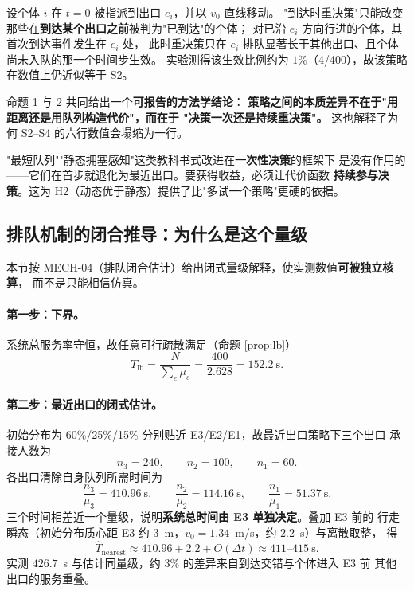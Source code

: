 \begin{csfprop}[命题 2（到达时重决策的生效范围）]
\label{prop:arrival}
设个体 $i$ 在 $t=0$ 被指派到出口 $e_i$，并以 $v_0$ 直线移动。
"到达时重决策"只能改变那些在\textbf{到达某个出口之前}被判为"已到达"的个体；
对已沿 $e_i$ 方向行进的个体，其首次到达事件发生在 $e_i$ 处，
此时重决策只在 $e_i$ 排队显著长于其他出口、且个体尚未入队的那一个时间步生效。
实验测得该生效比例约为 $1\%$（4/400），故该策略在数值上仍近似等于 S2。
\end{csfprop}

命题 1 与 2 共同给出一个\textbf{可报告的方法学结论}：
\textbf{策略之间的本质差异不在于"用距离还是用队列构造代价"，而在于
"决策一次还是持续重决策"。} 这也解释了为何 S2--S4 的六行数值会塌缩为一行。

\begin{csftake}[命题 1--2 的实践含义]
"最短队列""静态拥塞感知"这类教科书式改进在\textbf{一次性决策}的框架下
是没有作用的——它们在首步就退化为最近出口。要获得收益，必须让代价函数
\textbf{持续参与决策}。这为 H2（动态优于静态）提供了比"多试一个策略"更硬的依据。
\end{csftake}

\subsection{排队机制的闭合推导：为什么是这个量级}
\label{sec:queueing}

本节按 MECH-04（排队闭合估计）给出闭式量级解释，使实测数值\textbf{可被独立核算}，
而不是只能相信仿真。

\paragraph{第一步：下界。}
系统总服务率守恒，故任意可行疏散满足（命题 \ref{prop:lb}）
\[
  T_{\mathrm{lb}}=\frac{N}{\sum_e\mu_e}=\frac{400}{2.628}=152.2\ \text{s}.
\]

\paragraph{第二步：最近出口的闭式估计。}
初始分布为 60\%/25\%/15\% 分别贴近 E3/E2/E1，故最近出口策略下三个出口
承接人数为
\[
  n_3=240,\qquad n_2=100,\qquad n_1=60 .
\]
各出口清除自身队列所需时间为
\begin{equation}
  \frac{n_3}{\mu_3}=410.96\ \text{s},\qquad
  \frac{n_2}{\mu_2}=114.16\ \text{s},\qquad
  \frac{n_1}{\mu_1}=51.37\ \text{s}.
  \label{eq:clear}
\end{equation}
三个时间相差近一个量级，说明\textbf{系统总时间由 E3 单独决定}。叠加 E3 前的
行走瞬态（初始分布质心距 E3 约 $3$~m，$v_0=1.34$~m/s，约 $2.2$~s）与离散取整，
得
\begin{equation}
  \widehat T_{\text{nearest}}\approx410.96+2.2+O(\Delta t)\approx411\text{--}415\ \text{s}.
  \label{eq:nearest-est}
\end{equation}
实测 $426.7$~s 与估计同量级，约 $3\%$ 的差异来自到达交错与个体进入 E3 前
其他出口的服务重叠。

